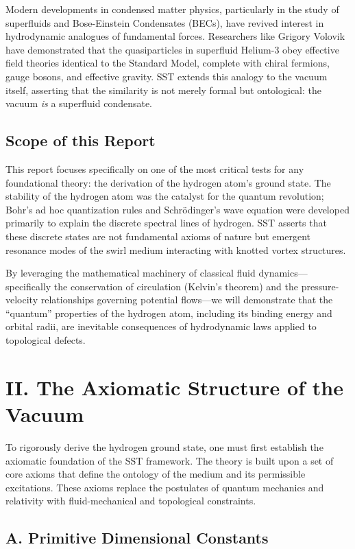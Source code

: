 \documentclass[11pt]{article}
\begin{document}
Modern developments in condensed matter physics, particularly in the study of superfluids and Bose-Einstein Condensates (BECs), have revived interest in hydrodynamic analogues of fundamental forces. Researchers like Grigory Volovik have demonstrated that the quasiparticles in superfluid Helium-3 obey effective field theories identical to the Standard Model, complete with chiral fermions, gauge bosons, and effective gravity. SST extends this analogy to the vacuum itself, asserting that the similarity is not merely formal but ontological: the vacuum \textit{is} a superfluid condensate.

\subsection*{Scope of this Report}

This report focuses specifically on one of the most critical tests for any foundational theory: the derivation of the hydrogen atom's ground state. The stability of the hydrogen atom was the catalyst for the quantum revolution; Bohr's ad hoc quantization rules and Schrödinger's wave equation were developed primarily to explain the discrete spectral lines of hydrogen. SST asserts that these discrete states are not fundamental axioms of nature but emergent resonance modes of the swirl medium interacting with knotted vortex structures.

By leveraging the mathematical machinery of classical fluid dynamics---specifically the conservation of circulation (Kelvin’s theorem) and the pressure-velocity relationships governing potential flows---we will demonstrate that the ``quantum'' properties of the hydrogen atom, including its binding energy and orbital radii, are inevitable consequences of hydrodynamic laws applied to topological defects.

\section*{II. The Axiomatic Structure of the Vacuum}

To rigorously derive the hydrogen ground state, one must first establish the axiomatic foundation of the SST framework. The theory is built upon a set of core axioms that define the ontology of the medium and its permissible excitations. These axioms replace the postulates of quantum mechanics and relativity with fluid-mechanical and topological constraints.

\subsection*{A. Primitive Dimensional Constants}
\end{document}
